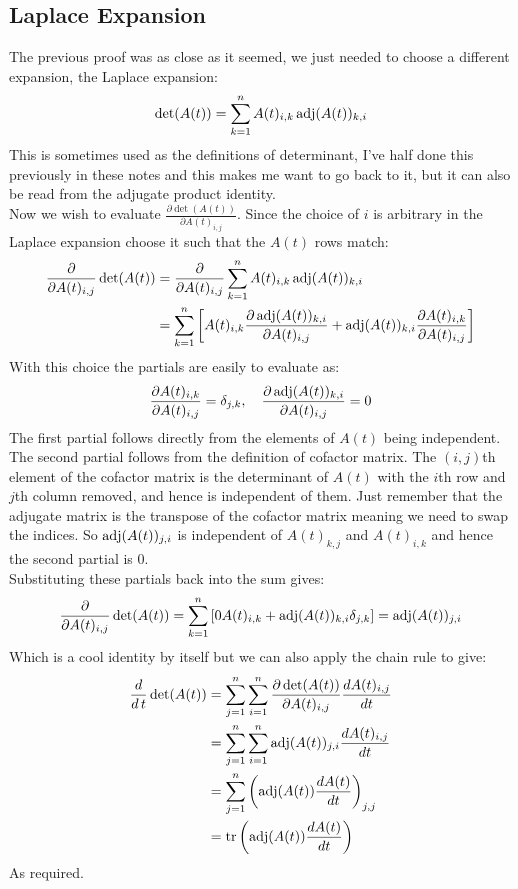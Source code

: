 \subsection{Laplace Expansion}
The previous proof was as close as it seemed,
we just needed to choose a different expansion,
the Laplace expansion:
\[\det(A(t)) = \sum_{k=1}^nA(t)_{i,k}\operatorname{adj}(A(t))_{k,i}\]
This is sometimes used as the definitions of determinant,
I've half done this previously in these notes and this makes me want to go back to it,
but it can also be read from the adjugate product identity.
\\

Now we wish to evaluate $\frac{\partial\det(A(t))}{\partial A(t)_{i,j}}$.
Since the choice of $i$ is arbitrary in the Laplace expansion choose it such that the $A(t)$ rows match:
\[\begin{aligned}
	\frac{\partial}{\partial A(t)_{i,j}}\det(A(t)) &= \frac{\partial}{\partial A(t)_{i,j}}\sum_{k=1}^nA(t)_{i,k}\operatorname{adj}(A(t))_{k,i}\\
	&= \sum_{k=1}^n\left[A(t)_{i,k}\frac{\partial\operatorname{adj}(A(t))_{k,i}}{\partial A(t)_{i,j}}+\operatorname{adj}(A(t))_{k,i}\frac{\partial A(t)_{i,k}}{\partial A(t)_{i,j}}\right]\\
\end{aligned}\]
With this choice the partials are easily to evaluate as:
\[\frac{\partial A(t)_{i,k}}{\partial A(t)_{i,j}}=\delta_{j,k},\quad\frac{\partial\operatorname{adj}(A(t))_{k,i}}{\partial A(t)_{i,j}}=0\]
The first partial follows directly from the elements of $A(t)$ being independent.
The second partial follows from the definition of cofactor matrix.
The $(i,j)$th element of the cofactor matrix is the determinant of $A(t)$ with the $i$th row and $j$th column removed,
and hence is independent of them.
Just remember that the adjugate matrix is the transpose of the cofactor matrix meaning we need to swap the indices.
So $\operatorname{adj}(A(t))_{j,i}$ is independent of $A(t)_{k,j}$ and $A(t)_{i,k}$ and hence the second partial is $0$.
\\

Substituting these partials back into the sum gives:
\[\frac{\partial}{\partial A(t)_{i,j}}\det(A(t)) = \sum_{k=1}^n\left[0A(t)_{i,k}+\operatorname{adj}(A(t))_{k,i}\delta_{j,k}\right]=\operatorname{adj}(A(t))_{j,i}\]
Which is a cool identity by itself but we can also apply the chain rule to give:
\[\begin{aligned}
	\frac{d}{d\,t}\det(A(t)) &= \sum_{j=1}^n\sum_{i=1}^n\frac{\partial\det(A(t))}{\partial A(t)_{i,j}}\frac{d A(t)_{i,j}}{dt}\\
	&= \sum_{j=1}^n\sum_{i=1}^n\operatorname{adj}(A(t))_{j,i}\frac{d A(t)_{i,j}}{dt}\\
	&= \sum_{j=1}^n\left(\operatorname{adj}(A(t))\frac{d A(t)}{dt}\right)_{j,j}\\
	&= \operatorname{tr}\left(\operatorname{adj}(A(t))\frac{d A(t)}{dt}\right)\\
\end{aligned}\]
As required.


